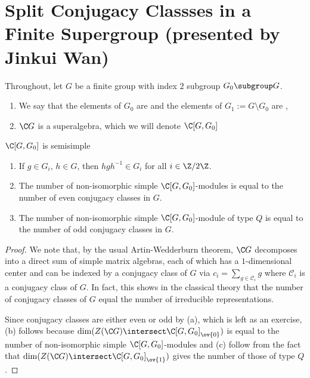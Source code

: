 \documentclass[11pt,leqno,oneside]{amsbook}
\newcommand{\CC}{\mathcal{C}} %
\numberwithin{thm}{section}
\begin{document}
\section{Split Conjugacy Classses in a Finite Supergroup (presented by
  Jinkui Wan)}
Throughout, let \(G\) be a finite group with index \(2\) subgroup
\(G_0 \subgroup G\).
\begin{defn}
  \begin{enumerate}
  \item We say that the elements of \(G_0\) are  and the
  elements of \(G_1 := G \setminus G_0\) are ,
  \item \(\C G\) is a superalgebra, which we will denote \(\C[G,G_0]\)
  \end{enumerate}
\end{defn}
\begin{thm}
  \(\C[G,G_0]\) is semisimple
\end{thm}
\begin{prop}
  \begin{enumerate}
  \item If \(g \in G_i\), \(h \in G\), then \(hgh^{-1} \in G_i\) for
    all \(i \in \Z/2\Z\).
  \item The number of non-isomorphic simple \(\C[G,G_0]\)-modules is
    equal to the number of even conjugacy classes in \(G\).
  \item The number of non-isomorphic simple \(\C[G,G_0]\)-module of
    type \(Q\) is equal to the number of odd conjugacy classes in \(G\).
  \end{enumerate}
\end{prop}
\begin{proof}
  We note that, by the usual Artin-Wedderburn theorem, \(\C G\)
  decomposes into a direct sum of simple matrix algebras, each of
  which has a \(1\)-dimensional center and can be indexed by a
  conjugacy class of \(G\) via \(c_i = \sum_{g \in \CC_i} g\) where
  \(\CC_i\) is a conjugacy class of \(G\). In fact, this shows in the
  classical theory that the number of conjugacy classes of \(G\) equal
  the number of irreducible representations.
  
  Since conjugacy classes are either even or odd by (a), which is left
  as an exercise, (b) follows
  because \(\dim (Z(\C G) \intersect 
  \C[G,G_0]_{\ov{0}})\) is equal to the number of non-isomorphic
  simple \(\C[G,G_0]\)-modules and (c) follow from the fact that \(\dim(Z(\C G)
  \intersect \C[G,G_0]_{\ov{1}})\) gives the number of those of type \(Q\).
\end{proof}
\end{document}
